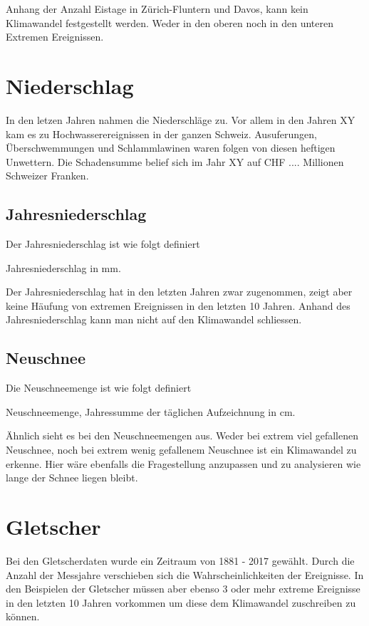 \begin{refsection}
Anhang der Anzahl Eistage in Zürich-Fluntern und Davos, kann kein Klimawandel festgestellt werden. Weder in den oberen noch in den unteren Extremen Ereignissen.


\section{Niederschlag}
In den letzen Jahren nahmen die Niederschläge zu. Vor allem in den Jahren XY kam es zu Hochwasserereignissen in der ganzen Schweiz. Ausuferungen, Überschwemmungen und Schlammlawinen waren folgen von diesen heftigen Unwettern. Die Schadensumme belief sich im Jahr XY auf CHF .... Millionen Schweizer Franken. 

\subsection{Jahresniederschlag}
Der Jahresniederschlag ist wie folgt definiert

\begin{definition}
Jahresniederschlag in mm.
\end{definition}

Der Jahresniederschlag hat in den letzten Jahren zwar zugenommen, zeigt aber keine Häufung von extremen Ereignissen in den letzten 10 Jahren. Anhand des Jahresniederschlag kann man nicht auf den Klimawandel schliessen.


\subsection{Neuschnee}
Die Neuschneemenge ist wie folgt definiert

\begin{definition}
Neuschneemenge, Jahressumme der täglichen Aufzeichnung in cm.
\end{definition}

Ähnlich sieht es bei den Neuschneemengen aus. Weder bei extrem viel gefallenen Neuschnee, noch bei extrem wenig gefallenem Neuschnee ist ein Klimawandel zu erkenne. Hier wäre ebenfalls die Fragestellung anzupassen und zu analysieren wie lange der Schnee liegen bleibt.


\section{Gletscher}
Bei den Gletscherdaten wurde ein Zeitraum von 1881 - 2017 gewählt. Durch die Anzahl der Messjahre verschieben sich die Wahrscheinlichkeiten der Ereignisse. In den Beispielen der Gletscher müssen aber ebenso 3 oder mehr extreme Ereignisse in den letzten 10 Jahren vorkommen um diese dem Klimawandel zuschreiben zu können.


\end{refsection}
